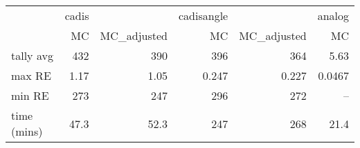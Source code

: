 \begin{tabular}{lrrrrr}
\toprule
{} & cadis &             & cadisangle &             & analog \\
{} &    MC & MC\_adjusted &         MC & MC\_adjusted &     MC \\
\midrule
tally avg   &   432 &         390 &        396 &         364 &   5.63 \\
max RE      &  1.17 &        1.05 &      0.247 &       0.227 & 0.0467 \\
min RE      &   273 &         247 &        296 &         272 &    -- \\
time (mins) &  47.3 &        52.3 &        247 &         268 &   21.4 \\
\bottomrule
\end{tabular}
